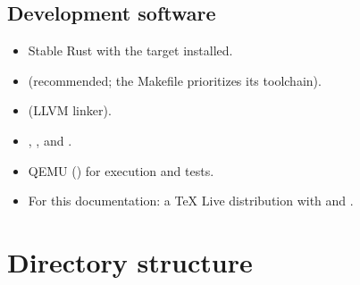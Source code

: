 \subsection{Development software}

\begin{itemize}
  \item Stable Rust with the  target installed.
  \item {} (recommended; the Makefile prioritizes its toolchain).
  \item {} (LLVM linker).
  \item {}, ,  and
        .
  \item QEMU () for execution and tests.
  \item For this documentation: a TeX Live distribution with
         and .
\end{itemize}

\section{Directory structure}

